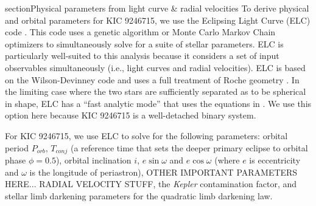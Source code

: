 section{Physical parameters from light curve \& radial velocities}\label{model}
To derive physical and orbital parameters for KIC 9246715, we use the Eclipsing Light Curve (ELC) code \citep{oro00}. This code uses a genetic algorithm or Monte Carlo Markov Chain optimizers to simultaneously solve for a suite of stellar parameters. ELC is particularly well-suited to this analysis because it considers a set of input observables simultaneously (i.e., light curves and radial velocities). ELC is based on the Wilson-Devinney code \citep{wil71} and uses a full treatment of Roche geometry \citep{avn75}. In the limiting case where the two stars are sufficiently separated as to be spherical in shape, ELC has a ``fast analytic mode'' that uses the equations in \citep{gim06}. We use this option here because KIC 9246715 is a well-detached binary system.

For KIC 9246715, we use ELC to solve for the following parameters: orbital period $P_{orb}$, $T_{conj}$ (a reference time that sets the deeper primary eclipse to orbital phase $\phi = 0.5$), orbital inclination $i$, $e \sin \omega$ and $e \cos \omega$ (where $e$ is eccentricity and $\omega$ is the longitude of periastron), OTHER IMPORTANT PARAMETERS HERE... RADIAL VELOCITY STUFF, the \emph{Kepler} contamination factor, and stellar limb darkening parameters for the quadratic limb darkening law.


%

